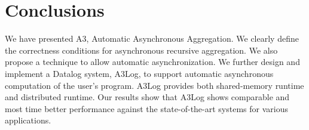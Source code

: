\section{Conclusions}
\label{sec:conclusion}

We have presented A3, Automatic Asynchronous Aggregation. We clearly define the correctness conditions for asynchronous recursive aggregation.  We also propose a technique to allow automatic asynchronization. We further design and implement a Datalog system, A3Log, to support automatic asynchronous computation of the user's program. A3Log provides both shared-memory runtime and distributed runtime. Our results show that A3Log shows comparable and most time better performance against the state-of-the-art systems for various applications.

